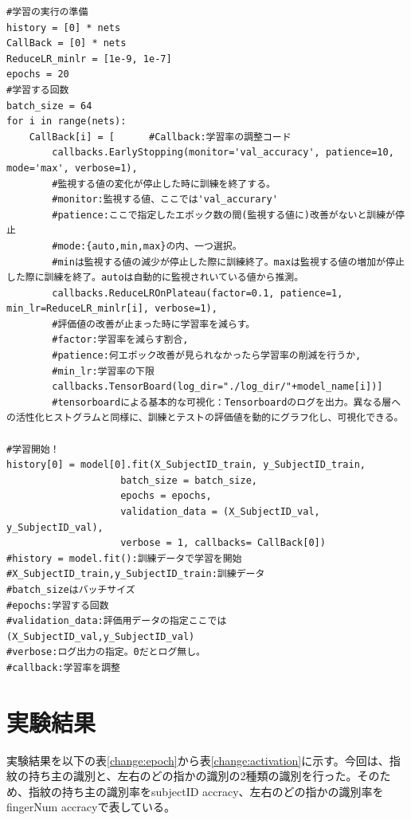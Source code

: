 \documentclass[a4paper, 11pt, titlepage]{jsarticle}
\begin{document}
\begin{lstlisting}[caption=パラメーター調整code2, label=parameter2]
#学習の実行の準備
history = [0] * nets
CallBack = [0] * nets
ReduceLR_minlr = [1e-9, 1e-7]
epochs = 20
#学習する回数
batch_size = 64
for i in range(nets):
    CallBack[i] = [      #Callback:学習率の調整コード
        callbacks.EarlyStopping(monitor='val_accuracy', patience=10, mode='max', verbose=1),
        #監視する値の変化が停止した時に訓練を終了する。
        #monitor:監視する値、ここでは'val_accurary'
        #patience:ここで指定したエポック数の間(監視する値に)改善がないと訓練が停止
        #mode:{auto,min,max}の内、一つ選択。
        #minは監視する値の減少が停止した際に訓練終了。maxは監視する値の増加が停止した際に訓練を終了。autoは自動的に監視されいている値から推測。
        callbacks.ReduceLROnPlateau(factor=0.1, patience=1, min_lr=ReduceLR_minlr[i], verbose=1),
        #評価値の改善が止まった時に学習率を減らす。
        #factor:学習率を減らす割合,
        #patience:何エポック改善が見られなかったら学習率の削減を行うか,
        #min_lr:学習率の下限
        callbacks.TensorBoard(log_dir="./log_dir/"+model_name[i])]
        #tensorboardによる基本的な可視化：Tensorboardのログを出力。異なる層への活性化ヒストグラムと同様に、訓練とテストの評価値を動的にグラフ化し、可視化できる。

#学習開始！
history[0] = model[0].fit(X_SubjectID_train, y_SubjectID_train,
                    batch_size = batch_size,
                    epochs = epochs, 
                    validation_data = (X_SubjectID_val, y_SubjectID_val),
                    verbose = 1, callbacks= CallBack[0])
#history = model.fit():訓練データで学習を開始
#X_SubjectID_train,y_SubjectID_train:訓練データ
#batch_sizeはバッチサイズ
#epochs:学習する回数
#validation_data:評価用データの指定ここでは(X_SubjectID_val,y_SubjectID_val)
#verbose:ログ出力の指定。0だとログ無し。
#callback:学習率を調整
\end{lstlisting}


\section{実験結果}

実験結果を以下の表\ref{change:epoch}から表\ref{change:activation}に示す。今回は、指紋の持ち主の識別と、左右のどの指かの識別の2種類の識別を行った。そのため、指紋の持ち主の識別率をsubjectID accracy、左右のどの指かの識別率をfingerNum accracyで表している。
\end{document}
